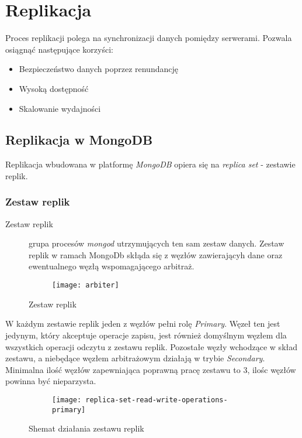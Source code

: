 \section{Replikacja}
Proces replikacji polega na synchronizacji danych pomiędzy serwerami. Pozwala osiągnąć następujące korzyści:
\begin{itemize}
	\item Bezpieczeństwo danych poprzez renundancję
	\item Wysoką dostępność
	\item Skalowanie wydajności
\end{itemize}

\subsection{Replikacja w MongoDB}
Replikacja wbudowana w platformę \textit{MongoDB} opiera się na \textit{replica set} - zestawie replik.

\subsubsection{Zestaw replik}
\begin{description}
\item[Zestaw replik]
 grupa procesów \textit{mongod} utrzymujących ten sam zestaw danych. Zestaw replik w ramach MongoDb skłąda się z węzłów zawierającyh dane oraz ewentualnego węzłą wspomagającego arbitraż.
\end{description}

\begin{figure}[H]
	\centering
	\begin{subfigure}{.5\textwidth}
		\texttt{[image: arbiter]}
		\label{fig:sub2}
	\end{subfigure}
	\caption{Zestaw replik}
	\label{fig:test}
\end{figure}

W każdym zestawie replik jeden z węzłów pełni rolę \textit{Primary}. Węzeł ten jest jedynym, który akceptuje operacje zapisu, jest również domyślnym węzłem dla wszystkich operacji odczytu z zestawu replik. Pozostałe węzły wchodzące w skład zestawu, a niebędące węzłem arbitrażowym działają w trybie \textit{Secondary}. Minimalna ilość węzłów zapewniająca poprawną pracę zestawu to 3, ilośc węzłów powinna być nieparzysta.

\begin{figure}[H]
	\centering
	\begin{subfigure}{.5\textwidth}
		\texttt{[image: replica-set-read-write-operations-primary]}
		\label{fig:sub2}
	\end{subfigure}
	\caption{Shemat działania zestawu replik}
	\label{fig:test}
\end{figure}


